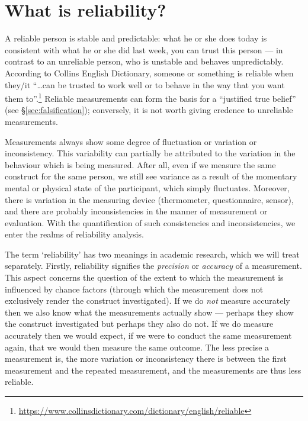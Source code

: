 \documentclass[
]{book}
\begin{document}
\hypertarget{what-is-reliability}{%
\section{What is reliability?}\label{what-is-reliability}}

A reliable person is stable and predictable: what he or she does
today is consistent with what he or she did last week, you can trust
this person --- in contrast to an unreliable person, who
is unstable and behaves unpredictably. According to Collins English Dictionary, someone or something is reliable when they/it ``\ldots can be trusted to work well or to behave in the way that you want them to''.\footnote{\url{https://www.collinsdictionary.com/dictionary/english/reliable}}
Reliable measurements can form the basis for a
``justified true belief'' (see
§\ref{sec:falsification}); conversely, it is not worth
giving credence to unreliable measurements.

Measurements always show some degree of fluctuation or variation or
inconsistency. This variability can partially be attributed to the
variation in the behaviour which is being measured. After all, even if we
measure the same construct for the same person, we still see variance
as a result of the momentary mental or physical state of the participant,
which simply fluctuates. Moreover, there is variation in the measuring device
(thermometer, questionnaire, sensor), and there are probably inconsistencies in the manner
of measurement or evaluation. With the quantification of such consistencies and
inconsistencies, we enter the realms of reliability analysis.

The term `reliability' has two meanings in academic research, which we
will treat separately. Firstly, reliability signifies the \emph{precision}
or \emph{accuracy} of a measurement. This aspect concerns the question of the extent
to which the measurement is influenced by chance factors (through which the
measurement does not exclusively render the construct investigated).
If we do \emph{not} measure
accurately then we also know what the measurements actually show ---
perhaps they show the construct investigated but perhaps they also do not. If we do
measure accurately then we would expect, if we were to conduct the same measurement again,
that we would then measure the same outcome. The less precise a measurement is, the more variation or inconsistency there is between the first measurement and the repeated measurement,
and the measurements are thus less reliable.
\end{document}
